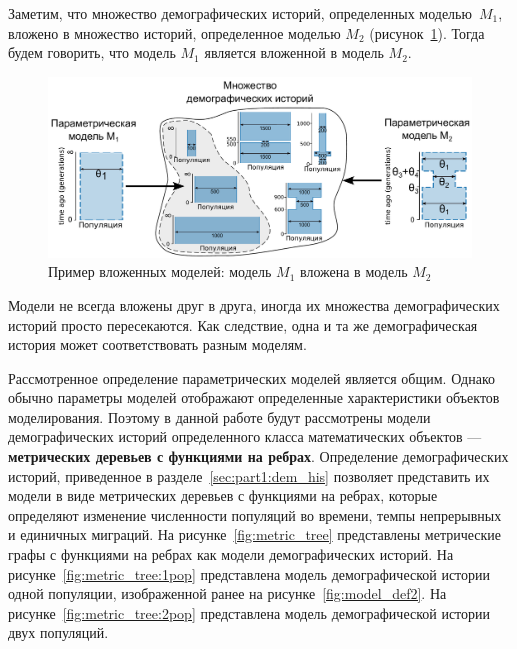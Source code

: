 Заметим, что множество демографических историй, определенных моделью~$M_1$, вложено в множество историй, определенное моделью $M_2$ (рисунок~\ref{fig:nested_models}).
Тогда будем говорить, что модель $M_1$ является вложенной  в модель $M_2$. 

\begin{figure}[ht]
    \centering
    \includegraphics[width=\textwidth]{images_2/nested_models.pdf}
    \caption{Пример вложенных моделей: модель $M_1$ вложена в модель $M_2$}
    \label{fig:nested_models}
\end{figure}

Модели не всегда вложены друг в друга, иногда их множества демографических историй просто пересекаются.
Как следствие, одна и та же демографическая история может соответствовать разным моделям.

Рассмотренное определение параметрических моделей является общим.
Однако обычно параметры моделей отображают определенные характеристики объектов моделирования.
Поэтому в данной работе будут рассмотрены модели демографических историй определенного класса математических объектов --- \textbf{метрических деревьев с функциями на ребрах}.
Определение демографических историй, приведенное в разделе~\ref{sec:part1:dem_his} позволяет представить их модели в виде метрических деревьев с функциями на ребрах, которые определяют изменение численности популяций во времени, темпы непрерывных и единичных миграций.
На рисунке~\ref{fig:metric_tree} представлены метрические графы с функциями на ребрах как модели демографических историй.
На рисунке~\ref{fig:metric_tree:1pop} представлена модель демографической истории одной популяции, изображенной ранее на рисунке~\ref{fig:model_def2}.
На рисунке~\ref{fig:metric_tree:2pop} представлена модель демографической истории двух популяций.


